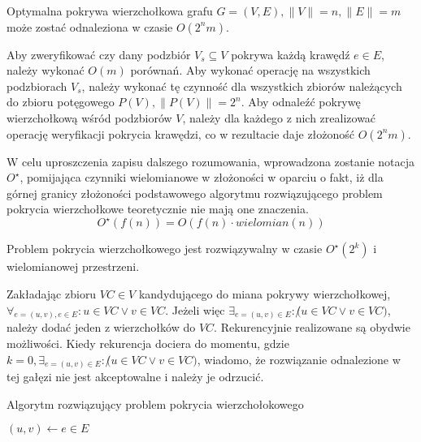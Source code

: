 \begin{theorem}
  Optymalna pokrywa wierzchołkowa grafu $G=(V,E), \|V\|=n, \|E\|=m$ może zostać 
  odnaleziona w czasie $O(2^{n}m)$.
\end{theorem}
\begin{bproof}
  Aby zweryfikować czy dany podzbiór $V_s \subseteq V$ pokrywa każdą krawędź
  $e \in E$, należy wykonać $O(m)$ porównań.
  Aby wykonać operację na wszystkich podzbiorach $V_s$, należy wykonać tę
  czynność dla wszystkich zbiorów należących do zbioru potęgowego 
  $P(V), \|P(V)\| = 2^{n}$.
  Aby odnaleźć pokrywę wierzchołkową wśród podzbiorów $V$, należy dla każdego z
  nich zrealizować operację weryfikacji pokrycia krawędzi, co w rezultacie daje 
  złożoność $O(2^{n}m)$.
\end{bproof}

W celu uproszczenia zapisu dalszego rozumowania, wprowadzona zostanie notacja
$O^{\star}$, pomijająca czynniki wielomianowe w złożoności w oparciu o fakt, 
iż dla górnej granicy złożoności podstawowego algorytmu rozwiązującego problem 
pokrycia wierzchołkowe teoretycznie nie mają one znaczenia.
\begin{equation*}
  O^{\star}(f(n))=O(f(n) \cdot wielomian(n))
\end{equation*}

\begin{theorem}
  Problem pokrycia wierzchołkowego jest rozwiązywalny w czasie $O^{\star}(2^k)$
  i wielomianowej przestrzeni.
\end{theorem}
\begin{bproof}
  Zakładając zbioru $VC \in V$ kandydującego do miana pokrywy wierzchołkowej,
  $\forall_{e=(u,v), e \in E}: u \in VC \lor v \in VC$.
  Jeżeli więc $\exists_{e=(u,v) \in E}: \not(u \in VC \lor v \in VC)$, należy
  dodać jeden z wierzchołków do $VC$. 
  Rekurencyjnie realizowane są obydwie możliwości.
  Kiedy rekurencja dociera do momentu, gdzie $k=0, \exists_{e=(u,v) \in E}:
  \not(u \in VC \lor v \in VC)$, wiadomo, że rozwiązanie odnalezione w tej
  gałęzi nie jest akceptowalne i należy je odrzucić.

  \begin{algorithm}
    \caption{Algorytm rozwiązujący problem pokrycia wierzchołokowego}\label{VC1}
    \begin{algorithmic}[1]
    \EndIf
  \EndIf
  \State $(u,v) \gets e \in E$
\EndFunction
\end{algorithmic}
\end{algorithm}
\end{bproof}
